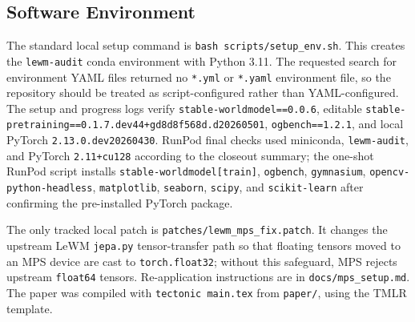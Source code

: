 \subsection{Software Environment}

The standard local setup command is \texttt{bash scripts/setup\_env.sh}. This
creates the \texttt{lewm-audit} conda environment with Python 3.11. The requested
search for environment YAML files returned no \texttt{*.yml} or \texttt{*.yaml}
environment file, so the repository should be treated as script-configured rather
than YAML-configured. The setup and progress logs verify
\texttt{stable-worldmodel==0.0.6}, editable
\texttt{stable-pretraining==0.1.7.dev44+gd8d8f568d.d20260501},
\texttt{ogbench==1.2.1}, and local PyTorch
\texttt{2.13.0.dev20260430}. RunPod final checks used miniconda,
\texttt{lewm-audit}, and PyTorch \texttt{2.11+cu128} according to the closeout
summary; the one-shot RunPod script installs \texttt{stable-worldmodel[train]},
\texttt{ogbench}, \texttt{gymnasium}, \texttt{opencv-python-headless},
\texttt{matplotlib}, \texttt{seaborn}, \texttt{scipy}, and
\texttt{scikit-learn} after confirming the pre-installed PyTorch package.

The only tracked local patch is \texttt{patches/lewm\_mps\_fix.patch}. It changes
the upstream LeWM \texttt{jepa.py} tensor-transfer path so that floating tensors
moved to an MPS device are cast to \texttt{torch.float32}; without this safeguard, MPS
rejects upstream \texttt{float64} tensors. Re-application instructions are in
\texttt{docs/mps\_setup.md}. The paper was compiled with \texttt{tectonic
main.tex} from \texttt{paper/}, using the TMLR template.

